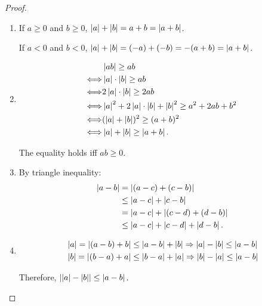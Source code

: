 \documentclass[class=understanding-analysis,crop=false]{standalone}
\begin{document}
\begin{proof}
    \begin{enumerate}[label = (\alph*)]
        \item If $a\ge 0$ and $b\ge 0$, $\left\vert{a}\right\vert + \left\vert{b}\right\vert = a + b = \left\vert{a + b}\right\vert$.
              \par If $a < 0$ and $b < 0$, $\left\vert{a}\right\vert + \left\vert{b}\right\vert = (-a) + (-b) = -(a + b) = \left\vert{a+b}\right\vert$.
        \item
              \begin{align*}
                                      & \left\vert{ab}\right\vert \ge ab                                                          \\
                  \Longleftrightarrow & \left\vert{a}\right\vert\cdot\left\vert{b}\right\vert \ge ab                                               \\
                  \Longleftrightarrow & 2\left\vert{a}\right\vert\cdot\left\vert{b}\right\vert \ge 2ab                                             \\
                  \Longleftrightarrow & \left\vert{a}\right\vert^{2} + 2\left\vert{a}\right\vert\cdot\left\vert{b}\right\vert + \left\vert{b}\right\vert^{2} \ge a^{2} + 2ab + b^{2} \\
                  \Longleftrightarrow & (\left\vert{a}\right\vert + \left\vert{b}\right\vert){}^{2} \ge (a+b){}^{2}                                \\
                  \Longleftrightarrow & \left\vert{a}\right\vert + \left\vert{b}\right\vert \ge \left\vert{a + b}\right\vert.
              \end{align*}
              \par The equality holds iff $ab\ge 0$.
        \item By triangle inequality:
              \begin{align*}
                  \left\vert{a - b}\right\vert & = \left\vert{(a - c) + (c - b)}\right\vert                    \\
                              & \le \left\vert{a - c}\right\vert + \left\vert{c - b}\right\vert                \\
                              & = \left\vert{a - c}\right\vert + \left\vert{(c - d) + (d - b)}\right\vert      \\
                              & \le \left\vert{a - c}\right\vert + \left\vert{c - d}\right\vert + \left\vert{d - b}\right\vert.
              \end{align*}
        \item
              \begin{align*}
                   & \left\vert{a}\right\vert = \left\vert{(a - b) + b}\right\vert \le \left\vert{a - b}\right\vert + \left\vert{b}\right\vert \Rightarrow \left\vert{a}\right\vert - \left\vert{b}\right\vert \le \left\vert{a - b}\right\vert \\
                   & \left\vert{b}\right\vert = \left\vert{(b - a) + a}\right\vert \le \left\vert{b - a}\right\vert + \left\vert{a}\right\vert \Rightarrow \left\vert{b}\right\vert - \left\vert{a}\right\vert \le \left\vert{a - b}\right\vert
              \end{align*}
              \par Therefore, $\left\vert{\left\vert{a}\right\vert - \left\vert{b}\right\vert}\right\vert\le \left\vert{a - b}\right\vert$.
    \end{enumerate}
\end{proof}
\end{document}

